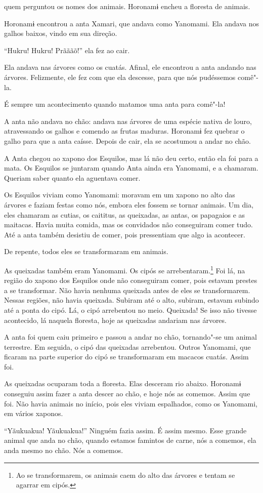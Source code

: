  

 

 quem perguntou os nomes dos animais. Horonamɨ encheu a
floresta de animais. 

Horonamɨ encontrou a anta Xamari, que andava como Yanomami. Ela andava
nos galhos baixos, vindo em sua direção. 

``Hukru! Hukru! Prãããõ!'' ela fez ao cair. 

Ela andava nas árvores como os cuatás. Afinal, ele encontrou a anta
andando nas árvores. Felizmente, ele fez com que ela descesse, para que
nós pudéssemos comê"-la. 

É sempre um acontecimento quando matamos uma anta para comê"-la! 

A anta não andava no chão: andava nas árvores de uma espécie nativa de
louro, atravessando os galhos e comendo as frutas maduras. Horonamɨ fez
quebrar o galho para que a anta caísse. Depois de cair, ela se acostumou
a andar no chão. 

A Anta chegou ao xapono dos Esquilos, mas lá não deu certo, então ela
foi para a mata. Os Esquilos se juntaram quando Anta ainda era Yanomami,
e a chamaram. Queriam saber quanto ela aguentava comer.

Os Esquilos viviam como Yanomami: moravam em um xapono no alto das
árvores e faziam festas como nós, embora eles fossem se tornar animais.
Um dia, eles chamaram as cutias, os caititus, as queixadas, as antas, os
papagaios e as maitacas. Havia muita comida, mas os convidados não
conseguiram comer tudo. Até a anta também desistiu de comer, pois
pressentiam que algo ia acontecer. 

De repente, todos eles se transformaram em animais. 

As queixadas também eram Yanomami. Os cipós se
arrebentaram.\footnote{   Ao se transformarem, os animais caem do alto das árvores e tentam se
agarrar em cipós.}  Foi lá, na região do xapono dos Esquilos
onde não conseguiram comer, pois estavam prestes a se transformar. Não
havia nenhuma queixada antes de eles se transformarem. Nessas regiões,
não havia queixada. Subiram até o alto, subiram, estavam subindo até a
ponta do cipó. Lá, o cipó arrebentou no meio. Queixada! Se isso não
tivesse acontecido, lá naquela floresta, hoje as queixadas andariam nas
árvores. 

A anta foi quem caiu primeiro e passou a andar no chão, tornando"-se um
animal terrestre. Em seguida, o cipó das queixadas arrebentou. Outros
Yanomami, que ficaram na parte superior do cipó se transformaram em
macacos cuatás. Assim foi. 

As queixadas ocuparam toda a floresta. Elas desceram rio abaixo.
Horonamɨ conseguiu assim fazer a anta descer ao chão, e hoje nós as
comemos. Assim que foi. Não havia animais no início, pois eles viviam
espalhados, como os Yanomami, em vários xaponos. 

``Yãukuakua! Yãukuakua!'' Ninguém fazia assim. É assim mesmo. Esse
grande animal que anda no chão, quando estamos famintos de carne, nós a
comemos, ela anda mesmo no chão. Nós a comemos. 

 
